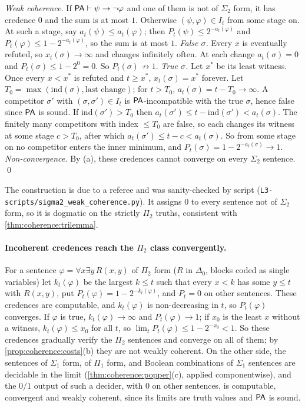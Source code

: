 \emph{Weak coherence.} If $\mathsf{PA}\vdash\psi\to\neg\varphi$ and one of them is not of $\Sigma_2$ form, it has credence $0$ and the sum is at most $1$. Otherwise $(\psi,\varphi)\in I_t$ from some stage on. At such a stage, say $a_t(\psi)\le a_t(\varphi)$; then $P_t(\psi)\le2^{-a_t(\varphi)}$ and $P_t(\varphi)\le1-2^{-a_t(\varphi)}$, so the sum is at most $1$.
\emph{False $\sigma$.} Every $x$ is eventually refuted, so $x_t(\sigma)\to\infty$ and changes infinitely often. At each change $a_t(\sigma)=0$ and $P_t(\sigma)\le1-2^0=0$. So $P_t(\sigma)\not\to1$.
\emph{True $\sigma$.} Let $x^*$ be its least witness. Once every $x<x^*$ is refuted and $t\ge x^*$, $x_t(\sigma)=x^*$ forever. Let $T_0=\max(\mathrm{ind}(\sigma),\text{last change})$; for $t>T_0$, $a_t(\sigma)=t-T_0\to\infty$. A competitor $\sigma'$ with $(\sigma,\sigma')\in I_t$ is $\mathsf{PA}$-incompatible with the true $\sigma$, hence false since $\mathsf{PA}$ is sound. If $\mathrm{ind}(\sigma')>T_0$ then $a_t(\sigma')\le t-\mathrm{ind}(\sigma')<a_t(\sigma)$. The finitely many competitors with index $\le T_0$ are false, so each changes its witness at some stage $c>T_0$, after which $a_t(\sigma')\le t-c<a_t(\sigma)$. So from some stage on no competitor enters the inner minimum, and $P_t(\sigma)=1-2^{-a_t(\sigma)}\to1$.
\emph{Non-convergence.} By (a), these credences cannot converge on every $\Sigma_2$ sentence. \qed

The construction is due to a referee and was sanity-checked by script (\nolinkurl{L3-scripts/sigma2_weak_coherence.py}). It assigns $0$ to every sentence not of $\Sigma_2$ form, so it is dogmatic on the strictly $\Pi_2$ truths, consistent with \cref{thm:coherence:trilemma}.

\paragraph{Incoherent credences reach the $\Pi_2$ class convergently.} For a sentence $\varphi=\forall x\exists y\,R(x,y)$ of $\Pi_2$ form ($R$ in $\Delta_0$, blocks coded as single variables) let $k_t(\varphi)$ be the largest $k\le t$ such that every $x<k$ has some $y\le t$ with $R(x,y)$, put $P_t(\varphi)=1-2^{-k_t(\varphi)}$, and $P_t=0$ on other sentences. These credences are computable, and $k_t(\varphi)$ is non-decreasing in $t$, so $P_t(\varphi)$ converges. If $\varphi$ is true, $k_t(\varphi)\to\infty$ and $P_t(\varphi)\to1$; if $x_0$ is the least $x$ without a witness, $k_t(\varphi)\le x_0$ for all $t$, so $\lim_tP_t(\varphi)\le1-2^{-x_0}<1$. So these credences gradually verify the $\Pi_2$ sentences and converge on all of them; by \cref{prop:coherence:costs}(b) they are not weakly coherent. On the other side, the sentences of $\Sigma_1$ form, of $\Pi_1$ form, and Boolean combinations of $\Sigma_1$ sentences are decidable in the limit (\cref{thm:coherence:popper}(c), applied componentwise), and the $0/1$ output of such a decider, with $0$ on other sentences, is computable, convergent and weakly coherent, since its limits are truth values and $\mathsf{PA}$ is sound.

